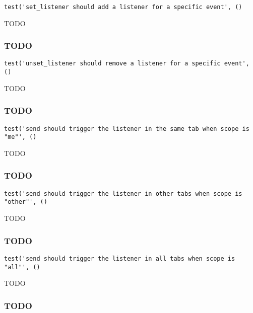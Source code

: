 \documentclass[a4paper]{article}
\begin{document}
\begin{lstlisting}
test('set_listener should add a listener for a specific event', ()
\end{lstlisting}

TODO

\hypertarget{toc735}{}
\subsubsection{TODO}

\begin{lstlisting}
test('unset_listener should remove a listener for a specific event', ()
\end{lstlisting}

TODO

\hypertarget{toc736}{}
\subsubsection{TODO}

\begin{lstlisting}
test('send should trigger the listener in the same tab when scope is "me"', ()
\end{lstlisting}

TODO

\hypertarget{toc737}{}
\subsubsection{TODO}

\begin{lstlisting}
test('send should trigger the listener in other tabs when scope is "other"', ()
\end{lstlisting}

TODO

\hypertarget{toc738}{}
\subsubsection{TODO}

\begin{lstlisting}
test('send should trigger the listener in all tabs when scope is "all"', ()
\end{lstlisting}

TODO

\hypertarget{toc739}{}
\subsubsection{TODO}
\end{document}
